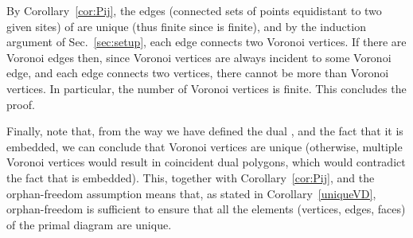 \documentclass[11pt]{article}
\begin{document}
By Corollary~\ref{cor:Pij}, the edges (connected sets of points equidistant to two given sites) of  are unique (thus finite since  is finite), and by the induction argument of Sec.~\ref{sec:setup}, each edge connects two Voronoi vertices. If there are  Voronoi edges then, since Voronoi vertices are always incident to some Voronoi edge, and each edge connects two vertices, there cannot be more than  Voronoi vertices. In particular, the number of Voronoi vertices is finite. This concludes the proof. 

Finally, note that, from the way we have defined the dual , and the fact that it is embedded, we can conclude that Voronoi vertices are unique (otherwise, multiple Voronoi vertices would result in coincident dual polygons, which would contradict the fact that  is embedded). 
This, together with Corollary~\ref{cor:Pij}, and the  orphan-freedom assumption means that, as stated in Corollary~\ref{uniqueVD}, orphan-freedom is sufficient to ensure that all the elements (vertices, edges, faces) of the primal diagram are unique. 
\end{document}
